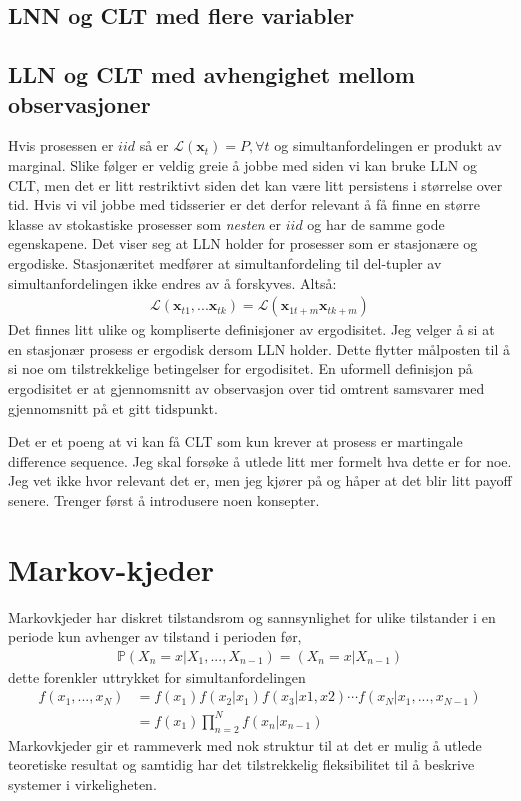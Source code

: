 \subsection{LNN og CLT med flere variabler}
\subsection{LLN og CLT med avhengighet mellom observasjoner}
Hvis prosessen er $iid$ så er $\mathcal{L}(\mathbf{x}_t)=P, \forall t$ og simultanfordelingen er produkt av marginal. Slike følger er veldig greie å jobbe med siden vi kan bruke LLN og CLT, men det er litt restriktivt siden det kan være litt persistens i størrelse over tid. Hvis vi vil jobbe med tidsserier er det derfor relevant å få finne en større klasse av stokastiske prosesser som \textit{nesten} er $iid$ og har de samme gode egenskapene. Det viser seg at LLN holder for prosesser som er stasjonære og ergodiske. Stasjonæritet medfører at simultanfordeling til del-tupler av simultanfordelingen ikke endres av å forskyves. Altså:
\begin{align}
\mathcal{L}(\mathbf{x}_{t1},...\mathbf{x}_{tk}) =\mathcal{L}(\mathbf{x}_{1t+m} \mathbf{x}_{tk+m})
\end{align}
Det finnes litt ulike og kompliserte definisjoner av ergodisitet. Jeg velger å si at en stasjonær prosess er ergodisk dersom LLN holder. Dette flytter målposten til å si noe om tilstrekkelige betingelser for ergodisitet. En uformell definisjon på ergodisitet er at gjennomsnitt av observasjon over tid omtrent samsvarer med gjennomsnitt på et gitt tidspunkt.

Det er et poeng at vi kan få CLT som kun krever at prosess er martingale difference sequence. Jeg skal forsøke å utlede litt mer formelt hva dette er for noe. Jeg vet ikke hvor relevant det er, men jeg kjører på og håper at det blir litt payoff senere. Trenger først å introdusere noen konsepter.
\section{Markov-kjeder}
Markovkjeder har diskret tilstandsrom og sannsynlighet for ulike tilstander i en periode kun avhenger av tilstand i perioden før,
\begin{align}
\mathbb{P}(X_{n}=x|X_1,...,X_{n-1})=(X_{n}=x|X_{n-1})
\end{align}
dette forenkler uttrykket for simultanfordelingen
\begin{align}
f(x_1,...,x_N) &= f(x_1)f(x_2|x_1)f(x_3|x1,x2)\cdots f(x_N|x_1,...,x_{N-1}) \\
&= f(x_1)\prod_{n=2}^N f(x_n|x_{n-1}) 
\end{align}
Markovkjeder gir et rammeverk med nok struktur til at det er mulig å utlede teoretiske resultat og samtidig har det tilstrekkelig fleksibilitet til å beskrive systemer i virkeligheten.

